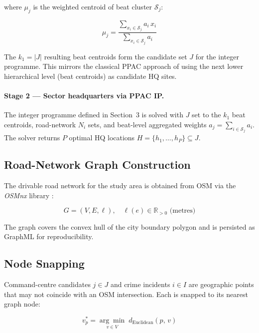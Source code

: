 \documentclass[12pt]{article}
\begin{document}
where $\mu_j$ is the weighted centroid of beat cluster $\mathcal{S}_j$:

\begin{equation}
    \mu_j = \frac{\displaystyle\sum_{x_i \in \mathcal{S}_j} a_i\, x_i}
                 {\displaystyle\sum_{x_i \in \mathcal{S}_j} a_i}
\end{equation}

The $k_1 = |J|$ resulting beat centroids form the candidate set $J$ for the
integer programme.  This mirrors the classical PPAC approach of using the
next lower hierarchical level (beat centroids) as candidate HQ sites.

\paragraph{Stage 2 --- Sector headquarters via PPAC IP.}
The integer programme defined in Section~3 is solved with $J$ set to the
$k_1$ beat centroids, road-network $N_i$ sets, and beat-level aggregated
weights $a_j = \sum_{i \in \mathcal{S}_j} a_i$.  The solver returns $P$
optimal HQ locations $H = \{h_1,\dots,h_P\} \subseteq J$.

\subsection{Road-Network Graph Construction}

The drivable road network for the study area is obtained from OSM via the
\textit{OSMnx} library \cite{boeing2017}:

\begin{equation}
    G = (V, E, \ell), \quad \ell(e) \in \mathbb{R}_{>0} \text{ (metres)}
\end{equation}

The graph covers the convex hull of the city boundary polygon and is persisted
as GraphML for reproducibility.

\subsection{Node Snapping}

Command-centre candidates $j \in J$ and crime incidents $i \in I$ are
geographic points that may not coincide with an OSM intersection.  Each is
snapped to its nearest graph node:

\begin{equation}
    v^*_p = \underset{v \in V}{\arg\min}\; d_{\mathrm{Euclidean}}(p,\, v)
\end{equation}
\end{document}
